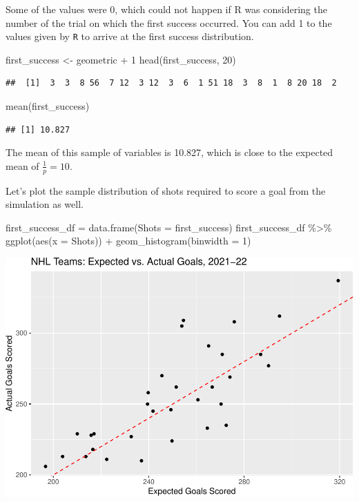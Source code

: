 \documentclass[
  11pt,
]{book}
\newenvironment{Shaded}{\begin{snugshade}}{\end{snugshade}}
\newcommand{\AttributeTok}[1]{\textcolor[rgb]{0.77,0.63,0.00}{#1}}
\newcommand{\DecValTok}[1]{\textcolor[rgb]{0.00,0.00,0.81}{#1}}
\newcommand{\FunctionTok}[1]{\textcolor[rgb]{0.00,0.00,0.00}{#1}}
\newcommand{\NormalTok}[1]{#1}
\newcommand{\OtherTok}[1]{\textcolor[rgb]{0.56,0.35,0.01}{#1}}
\newcommand{\SpecialCharTok}[1]{\textcolor[rgb]{0.00,0.00,0.00}{#1}}
\theoremstyle{definition}
\theoremstyle{definition}
\theoremstyle{definition}
\theoremstyle{definition}
\theoremstyle{remark}
\begin{document}
Some of the values were 0, which could not happen if R was considering the number of the trial on which the first success occurred. You can add 1 to the values given by \texttt{R} to arrive at the first success distribution.

\begin{Shaded}
\begin{Highlighting}[]
\NormalTok{first\_success }\OtherTok{\textless{}{-}}\NormalTok{ geometric }\SpecialCharTok{+} \DecValTok{1}
\FunctionTok{head}\NormalTok{(first\_success, }\DecValTok{20}\NormalTok{)}
\end{Highlighting}
\end{Shaded}

\begin{verbatim}
##  [1]  3  3  8 56  7 12  3 12  3  6  1 51 18  3  8  1  8 20 18  2
\end{verbatim}

\begin{Shaded}
\begin{Highlighting}[]
\FunctionTok{mean}\NormalTok{(first\_success)}
\end{Highlighting}
\end{Shaded}

\begin{verbatim}
## [1] 10.827
\end{verbatim}

The mean of this sample of variables is 10.827, which is close to the expected mean of \(\frac{1}{p} = 10\).

Let's plot the sample distribution of shots required to score a goal from the simulation as well.

\begin{Shaded}
\begin{Highlighting}[]
\NormalTok{first\_success\_df }\OtherTok{=} \FunctionTok{data.frame}\NormalTok{(}\AttributeTok{Shots =}\NormalTok{ first\_success)}
\NormalTok{first\_success\_df }\SpecialCharTok{\%\textgreater{}\%}
    \FunctionTok{ggplot}\NormalTok{(}\FunctionTok{aes}\NormalTok{(}\AttributeTok{x =}\NormalTok{ Shots)) }\SpecialCharTok{+} \FunctionTok{geom\_histogram}\NormalTok{(}\AttributeTok{binwidth =} \DecValTok{1}\NormalTok{)}
\end{Highlighting}
\end{Shaded}

\includegraphics{series_files/figure-latex/unnamed-chunk-28-1.pdf}
\end{document}
